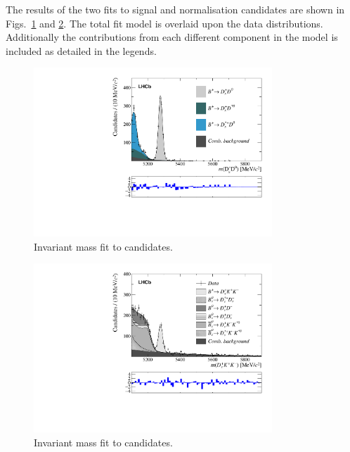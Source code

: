 The results of the two fits to signal and normalisation candidates are shown in Figs.~\ref{fig:fit_B2DsD0} and \ref{fig:fit_B2DsKK}. The total fit model is overlaid upon the data distributions. Additionally the contributions from each different component in the model is included as detailed in the legends.

\begin{figure}[!h]
    \centering
    \includegraphics[width=0.8\textwidth]{figs/B2DsKK/Fit_DsD0.pdf}
    \caption{Invariant mass fit to \decay{\Bp}{\Dsp\Dzb} candidates.}
    \label{fig:fit_B2DsD0}   
\end{figure}

\begin{figure}[!h]
    \centering
    \includegraphics[width=0.8\textwidth]{figs/B2DsKK/Fit_DsKK.pdf}
    \caption{Invariant mass fit to \decay{\Bp}{\Dsp\Kp\Km} candidates.}
    \label{fig:fit_B2DsKK}   
\end{figure}


